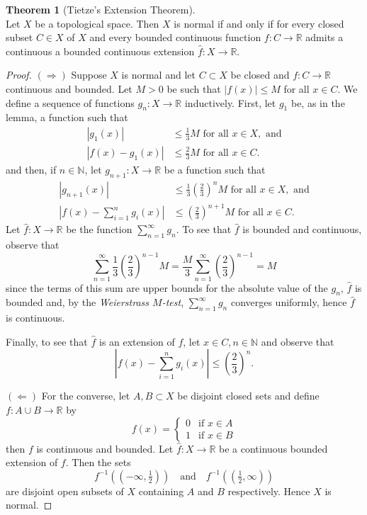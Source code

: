 \documentclass{book}
\theoremstyle{definition}
\newtheorem{theorem}{Theorem}[section]
\theoremstyle{remark}
\newcommand{\R}{\mathbb{R}}
\newcommand{\N}{\mathbb{N}}
\begin{document}
\begin{theorem}[Tietze's Extension Theorem]$ $\\
Let $X$ be a topological space. Then $X$ is normal if and only if for every closed subset $C\in X$ of $X$ and every bounded continuous function $f:C\to\R$ 
admits a continuous a bounded continuous extension $\hat f:X\to\R$.
\end{theorem}
\begin{proof}
$(\Rightarrow)$ Suppose $X$ is normal and let $C\subset X$ be closed and $f:C\to\R$ continuous and bounded. Let $M>0$ be such that $|f(x)|\leq M$ for all $x\in C$. We define a sequence of functions $g_n:X\to\R$ inductively. First, let $g_1$ be, as in the lemma, a function such that
\begin{align*}
    |g_1(x)|&\leq \frac{1}{3}M\text{ for all }x\in X,\text{ and}\\
    |f(x)-g_1(x)|&\leq \frac{2}{3}M\text{ for all }x\in C.
\end{align*}
and then, if $n\in\N$, let $g_{n+1}:X\to\R$ be a function such that
\begin{align*}
    |g_{n+1}(x)|&\leq \frac{1}{3}\left(\frac{2}{3}\right)^{n}M\text{ for all }x\in X,\text{ and}\\
    \left|f(x)-\sum_{i=1}^ng_i(x)\right|&\leq\left(\frac{2}{3}\right)^{n+1}M\text{ for all }x\in C.
\end{align*}
Let $\hat f:X\to\R$ be the function $\sum_{n=1}^\infty g_n$. To see that $\hat f$ is bounded and continuous, observe that
$$\sum_{n=1}^\infty \frac{1}{3}\left(\frac{2}{3}\right)^{n-1}M=\frac{M}{3}\sum_{n=1}^\infty\left(\frac{2}{3}\right)^{n-1}=M$$
since the terms of this sum are upper bounds for the absolute value of the $g_n$, $\hat f$ is bounded and, by the \textit{Weierstrass $M$-test}, $\sum_{n=1}^\infty g_n$ converges uniformly, hence $\hat f$ is continuous.

Finally, to see that $\hat f$ is an extension of $f$, let $x\in C,n\in\N$ and observe that
$$\left|f(x)-\sum_{i=1}^n g_i(x)\right|\leq \left(\frac{2}{3}\right)^n.$$

$(\Leftarrow)$ For the converse, let $A,B\subset X$ be disjoint closed sets and define $f:A\cup B\to\R$ by
$$f(x)=\begin{cases}0 & \text{if }x\in A\\ 1 & \text{if }x\in B\end{cases}$$
then $f$ is continuous and bounded. Let $\hat f:X\to\R$ be a continuous bounded extension of $f$. Then the sets
$$f^{-1}((-\infty,\tfrac{1}{2}))\quad\text{and}\quad f^{-1}((\tfrac{1}{2},\infty))$$
are disjoint open subsets of $X$ containing $A$ and $B$ respectively. Hence $X$ is normal.
\end{proof}
\end{document}
